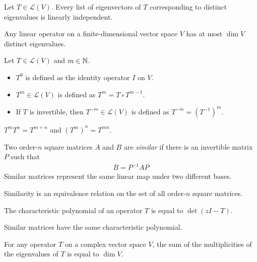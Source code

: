\documentclass{article}
\begin{document}
\begin{theorem}
  Let $T \in \mathcal{L}(V)$.
  Every list of eigenvectors of $T$ corresponding to distinct eigenvalues is linearly independent.
\end{theorem}

\begin{theorem}
  Any linear operator on a finite-dimensional vector space $V$ has at most $\dim V$ distinct eigenvalues.
\end{theorem}

\begin{definition}[$T^m$]
  Let $T \in \mathcal{L}(V)$ and $m \in \mathbb{N}$.
  \begin{itemize}
    \item $T^0$ is defined as the identity operator $I$ on $V$.
    \item $T^m \in \mathcal{L}(V)$ is defined as $T^m = T \circ T^{m - 1}$.
    \item If $T$ is invertible, then $T^{-m} \in \mathcal{L}(V)$ is defined as $T^{-m} = (T^{-1})^m$.
  \end{itemize}
\end{definition}

\begin{remark}
  $T^m T^n = T^{m + n}$ and $(T^m)^n = T^{mn}$.
\end{remark}

\begin{definition}
  Two order-$n$ square matrices $A$ and $B$ are \emph{similar} if there is an invertible matrix $P$ such that
  \begin{align}
    B = P^{-1}AP
  \end{align}
  Similar matrices represent the same linear map under two different bases.
\end{definition}

\begin{remark}
  Similarity is an equivalence relation on the set of all order-$n$ square matrices.
\end{remark}

\begin{definition}
  The characteristic polynomial of an operator $T$ is equal to $\det (zI - T)$.
\end{definition}

\begin{remark}
  Similar matrices have the same characteristic polynomial.
\end{remark}

\begin{theorem}
  For any operator $T$ on a complex vector space $V$, the sum of the multiplicities of the eigenvalues of $T$ is equal to $\dim V$.
\end{theorem}
\end{document}

